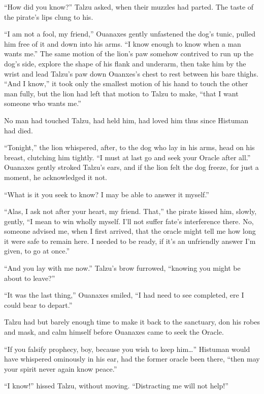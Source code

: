 ``How did you know?'' Talzu asked, when their muzzles had parted. The taste of the pirate's lips clung to his.

``I am not a fool, my friend,'' Ouanaxes gently unfastened the dog's tunic, pulled him free of it and down into his arms. ``I know enough to know when a man wants me.'' The same motion of the lion's paw somehow contrived to run up the dog's side, explore the shape of his flank and underarm, then take him by the wrist and lead Talzu's paw down Ouanxes's chest to rest between his bare thighs. ``And I know,'' it took only the smallest motion of his hand to touch the other man fully, but the lion had left that motion to Talzu to make, ``that I want someone who wants me.''

No man had touched Talzu, had held him, had loved him thus since Histuman had died.

``Tonight,'' the lion whispered, after, to the dog who lay in his arms, head on his breast, clutching him tightly. ``I must at last go and seek your Oracle after all.'' Ouanaxes gently stroked Talzu's ears, and if the lion felt the dog freeze, for just a moment, he acknowledged it not.

``What is it you seek to know? I may be able to answer it myself.''

``Alas, I ask not after your heart, my friend. That,'' the pirate kissed him, slowly, gently, ``I mean to win wholly myself. I'll not suffer fate's interference there. No, someone advised me, when I first arrived, that the oracle might tell me how long it were safe to remain here. I needed to be ready, if it's an unfriendly answer I'm given, to go at once.''

``And you lay with me now.'' Talzu's brow furrowed, ``knowing you might be about to leave?''

``It was the last thing,'' Ouanaxes smiled, ``I had need to see completed, ere I could bear to depart.''

\secdiv

\noindent Talzu had but barely enough time to make it back to the sanctuary, don his robes and mask, and calm himself before Ouanaxes came to seek the Oracle.

``If you falsify prophecy, boy, because you wish to keep him\ldots'' Histuman would have whispered ominously in his ear, had the former oracle been there, ``then may your spirit never again know peace.''

``I know!'' hissed Talzu, without moving. ``Distracting me will not help!''

